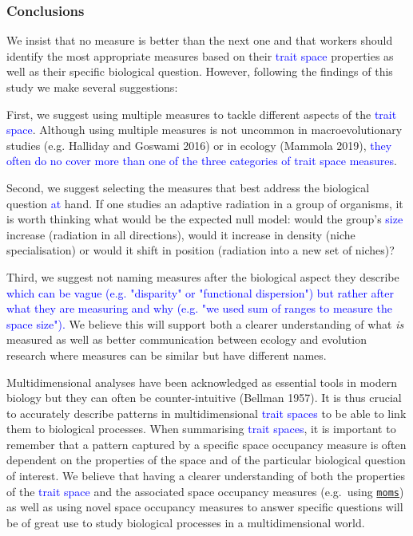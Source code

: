 \documentclass[]{article}
\begin{document}
\subsubsection{Conclusions}\label{conclusions}

We insist that no measure is better than the next one and that workers
should identify the most appropriate measures based on their
\textcolor{blue}{trait space} properties as well as their
specific biological question. However, following the findings of this
study we make several suggestions:

First, we suggest using multiple measures to tackle different aspects of
the \textcolor{blue}{trait space}. Although using multiple
measures is not uncommon in macroevolutionary studies (e.g. Halliday and
Goswami 2016) or in ecology (Mammola 2019),
\textcolor{blue}{they often do no cover more than one of the three categories of trait space measures}.

Second, we suggest selecting the measures that best address the
biological question \textcolor{blue}{at} hand. If one
studies an adaptive radiation in a group of organisms, it is worth
thinking what would be the expected null model: would the group's
\textcolor{blue}{size} increase (radiation in all
directions), would it increase in density (niche specialisation) or
would it shift in position (radiation into a new set of niches)?

Third, we suggest not naming measures after the biological aspect they
describe
\textcolor{blue}{which can be vague (e.g. "disparity" or "functional dispersion") but rather after what they are measuring and why (e.g. "we used sum of ranges to measure the space size").}
We believe this will support both a clearer understanding of what
\emph{is} measured as well as better communication between ecology and
evolution research where measures can be similar but have different
names.

Multidimensional analyses have been acknowledged as essential tools in
modern biology but they can often be counter-intuitive (Bellman 1957).
It is thus crucial to accurately describe patterns in multidimensional
\textcolor{blue}{trait spaces} to be able to link them to
biological processes. When summarising
\textcolor{blue}{trait spaces}, it is important to remember
that a pattern captured by a specific space occupancy measure is often
dependent on the properties of the space and of the particular
biological question of interest. We believe that having a clearer
understanding of both the properties of the
\textcolor{blue}{trait space} and the associated space
occupancy measures (e.g.~using
\href{https://tguillerme.shinyapps.io/moms/}{\texttt{moms}}) as well as
using novel space occupancy measures to answer specific questions will
be of great use to study biological processes in a multidimensional
world.
\end{document}
